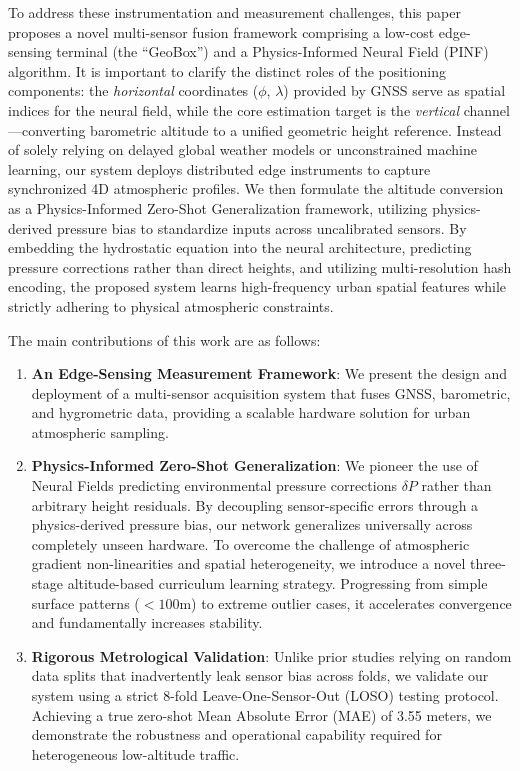 To address these instrumentation and measurement challenges, this paper proposes a novel multi-sensor fusion framework comprising a low-cost edge-sensing terminal (the ``GeoBox'') and a Physics-Informed Neural Field (PINF) algorithm. It is important to clarify the distinct roles of the positioning components: the \emph{horizontal} coordinates ($\phi$, $\lambda$) provided by GNSS serve as spatial indices for the neural field, while the core estimation target is the \emph{vertical} channel---converting barometric altitude to a unified geometric height reference. Instead of solely relying on delayed global weather models or unconstrained machine learning, our system deploys distributed edge instruments to capture synchronized 4D atmospheric profiles. We then formulate the altitude conversion as a Physics-Informed Zero-Shot Generalization framework, utilizing physics-derived pressure bias to standardize inputs across uncalibrated sensors. By embedding the hydrostatic equation into the neural architecture, predicting pressure corrections rather than direct heights, and utilizing multi-resolution hash encoding, the proposed system learns high-frequency urban spatial features while strictly adhering to physical atmospheric constraints.

The main contributions of this work are as follows:
\begin{enumerate}
    \item \textbf{An Edge-Sensing Measurement Framework}: We present the design and deployment of a multi-sensor acquisition system that fuses GNSS, barometric, and hygrometric data, providing a scalable hardware solution for urban atmospheric sampling.
    \item \textbf{Physics-Informed Zero-Shot Generalization}: We pioneer the use of Neural Fields predicting environmental pressure corrections $\delta P$ rather than arbitrary height residuals. By decoupling sensor-specific errors through a physics-derived pressure bias, our network generalizes universally across completely unseen hardware. To overcome the challenge of atmospheric gradient non-linearities and spatial heterogeneity, we introduce a novel three-stage altitude-based curriculum learning strategy. Progressing from simple surface patterns ($<100\text{m}$) to extreme outlier cases, it accelerates convergence and fundamentally increases stability.
    \item \textbf{Rigorous Metrological Validation}: Unlike prior studies relying on random data splits that inadvertently leak sensor bias across folds, we validate our system using a strict 8-fold Leave-One-Sensor-Out (LOSO) testing protocol. Achieving a true zero-shot Mean Absolute Error (MAE) of 3.55 meters, we demonstrate the robustness and operational capability required for heterogeneous low-altitude traffic.
\end{enumerate}
